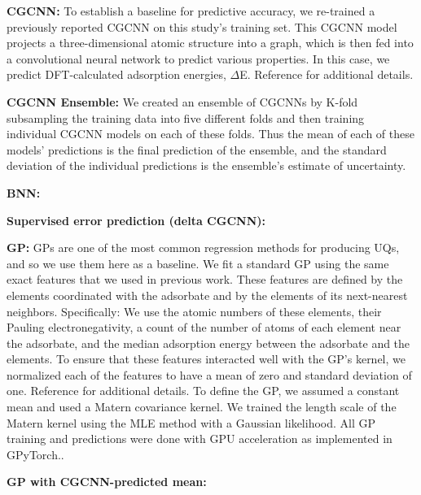 \documentclass[]{achemso}
\begin{document}
\textbf{\gls{CGCNN}:}
To establish a baseline for predictive accuracy, we re-trained a previously reported \gls{CGCNN}\cite{Xie2018, Back2019} on this study's training set.
This \gls{CGCNN} model projects a three-dimensional atomic structure into a graph, which is then fed into a convolutional neural network to predict various properties.
In this case, we predict \gls{DFT}-calculated adsorption energies, $\Delta$E.
Reference \citet{Back2019} for additional details.

\textbf{\gls{CGCNN} Ensemble:}
We created an ensemble of \gls{CGCNN}s by K-fold subsampling the training data into five different folds and then training individual \gls{CGCNN} models on each of these folds.
Thus the mean of each of these models' predictions is the final prediction of the ensemble, and the standard deviation of the individual predictions is the ensemble's estimate of uncertainty.

\textbf{\gls{BNN}:}

\textbf{Supervised error prediction (delta CGCNN):}

\textbf{\gls{GP}:}
\gls{GP}s are one of the most common regression methods for producing \gls{UQ}s, and so we use them here as a baseline.
We fit a standard \gls{GP} using the same exact features that we used in previous work.\cite{Tran2018}
These features are defined by the elements coordinated with the adsorbate and by the elements of its next-nearest neighbors.
Specifically:  We use the atomic numbers of these elements, their Pauling electronegativity, a count of the number of atoms of each element near the adsorbate, and the median adsorption energy between the adsorbate and the elements.
To ensure that these features interacted well with the \gls{GP}'s kernel, we normalized each of the features to have a mean of zero and standard deviation of one.
Reference \citet{Tran2018} for additional details.
To define the GP, we assumed a constant mean and used a Matern covariance kernel.
We trained the length scale of the Matern kernel using the \gls{MLE} method with a Gaussian likelihood.
All GP training and predictions were done with GPU acceleration as implemented in GPyTorch.\cite{Gardner2018}.

\textbf{\gls{GP} with \gls{CGCNN}-predicted mean:}
\end{document}
